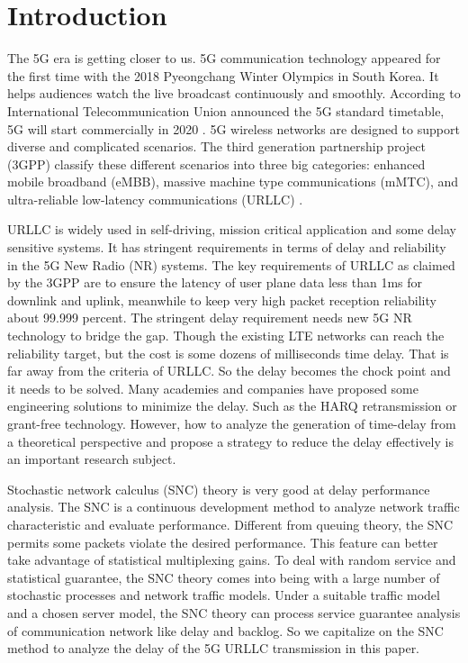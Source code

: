 \documentclass[runningheads]{llncs}
\begin{document}
\section{Introduction}
The 5G era is getting closer to us.
5G communication technology appeared for the first time with the 2018 Pyeongchang Winter Olympics in South Korea.
It helps audiences watch the live broadcast continuously and smoothly.
According to International Telecommunication Union announced the 5G standard timetable, 5G will start commercially in 2020 \cite{standard1}.
5G wireless networks are designed to support diverse and complicated scenarios.
The third generation partnership project (3GPP) classify these different scenarios into three big categories: enhanced mobile broadband (eMBB), massive machine type communications (mMTC), and ultra-reliable low-latency communications (URLLC) \cite{standard2}.

URLLC is widely used in self-driving, mission critical application and some delay sensitive systems.
It has stringent requirements in terms of delay and reliability in the 5G New Radio (NR) systems.
The key requirements of URLLC as claimed by the 3GPP are to ensure the latency of user plane data less than 1ms for downlink and uplink, meanwhile to keep very high packet reception reliability about 99.999 percent.\cite{article1}
The stringent delay requirement needs new 5G NR technology to bridge the gap.
Though the existing LTE networks can reach the reliability target, but the cost is some dozens of milliseconds time delay.
That is far away from the criteria of URLLC.
So the delay becomes the chock point and it needs to be solved.
Many academies and companies have proposed some engineering solutions to minimize the delay.
Such as the HARQ retransmission or grant-free technology.
However, how to analyze the generation of time-delay from a theoretical perspective and propose a strategy to reduce the delay effectively is an important research subject.

Stochastic network calculus (SNC) theory is very good at delay performance analysis.
The SNC is a continuous development method to analyze network traffic characteristic and evaluate performance\cite{book1}.
Different from queuing theory, the SNC permits some packets violate the desired performance.
This feature can better take advantage of statistical multiplexing gains\cite{article2}.
To deal with random service and statistical guarantee, the SNC theory comes into being with a large number of stochastic processes and network traffic models.
Under a suitable traffic model and a chosen server model, the SNC theory can process service guarantee analysis of communication network like delay and backlog.
So we capitalize on the SNC method to analyze the delay of the 5G URLLC transmission in this paper.
\end{document}
